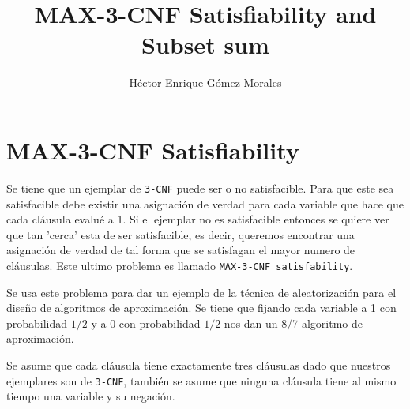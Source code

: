 \documentclass{article}
\author{Héctor Enrique Gómez Morales}
\title{MAX-3-CNF Satisfiability and Subset sum}
\begin{document}
\maketitle
\section{MAX-3-CNF Satisfiability}
Se tiene que un ejemplar de \texttt{3-CNF} puede ser o no satisfacible. Para que este sea satisfacible debe existir una asignación de verdad para cada variable que hace que cada cláusula evalué a 1. Si el ejemplar no es satisfacible entonces se quiere ver que tan 'cerca' esta de ser satisfacible, es decir, queremos encontrar una asignación de verdad de tal forma que se satisfagan el mayor numero de cláusulas. Este ultimo problema es llamado \texttt{MAX-3-CNF satisfability}.

Se usa este problema para dar un ejemplo de la técnica de aleatorización para el diseño de algoritmos de aproximación. Se tiene que fijando cada variable a 1 con probabilidad $1/2$ y a 0 con probabilidad $1/2$ nos dan un 8/7-algoritmo de aproximación.

Se asume que cada cláusula tiene exactamente tres cláusulas dado que nuestros ejemplares son de \texttt{3-CNF}, también se asume que ninguna cláusula tiene al mismo tiempo una variable y su negación.
\end{document}
